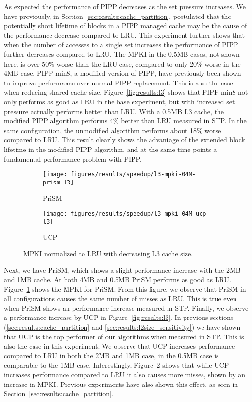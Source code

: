 As expected the performance of PIPP decreases as the set pressure increases.
We have previously, in Section~\ref{sec:results:cache_partition}, postulated that the potentially short lifetime of blocks in a PIPP managed cache may be the cause of the performance decrease compared to LRU.
This experiment further shows that when the number of accesses to a single set increases the performance of PIPP further decreases compared to LRU.
The MPKI in the 0.5MB cases, not shown here, is over 50\% worse than the LRU case, compared to only 20\% worse in the 4MB case.
PIPP-min8, a modified version of PIPP, have previously been shown to improve performance over normal PIPP replacement.
This is also the case when reducing shared cache size.
Figure~\ref{fig:results:l3} shows that PIPP-min8 not only performs as good as LRU in the base experiment, but with increased set pressure actually performs better than LRU.
With a 0.5MB L3 cache, the modified PIPP algorithm performs 4\% better than LRU measured in STP.
In the same configuration, the unmodified algorithm performs about 18\% worse compared to LRU.
This result clearly shows the advantage of the extended block lifetime in the modified PIPP algorithm, and at the same time points a fundamental performance problem with PIPP.


\begin{figure}[th]
    \centering
    \begin{subfigure}[b]{0.5\textwidth}
        \centering
        \texttt{[image: figures/results/speedup/l3-mpki-04M-prism-l3]}
        \caption{PriSM}
        \label{fig:results:l3:mpki-prism}
    \end{subfigure}%
    \begin{subfigure}[b]{0.5\textwidth}
        \centering
        \texttt{[image: figures/results/speedup/l3-mpki-04M-ucp-l3]}
        \caption{UCP}
        \label{fig:results:l3:mpki-ucp}
    \end{subfigure}
    \label{fig:results:l3:mpki}
    \caption{MPKI normalized to LRU with decreasing L3 cache size.}
\end{figure}

Next, we have PriSM, which shows a slight performance increase with the 2MB and 1MB cache. 
At both 4MB and 0.5MB PriSM performs as good as LRU.
Figure~\ref{fig:results:l3:mpki-prism} shows the MPKI for PriSM.
From this figure, we observe that PriSM in all configurations causes the same number of misses as LRU.
This is true even when PriSM shows an performance increase measured in STP.
Finally, we observe a performance increase by UCP in Figure~\ref{fig:results:l3}. 
In previous sections (\ref{sec:results:cache_partition} and \ref{sec:results:l2size_sensitivity}) we have shown that UCP is the top performer of our algorithms when measured in STP.
This is also the case in this experiment.
We observe that UCP increases performance compared to LRU in both the 2MB and 1MB case, in the 0.5MB case is comparable to the 1MB case.
Interestingly, Figure~\ref{fig:results:l3:mpki-ucp} shows that while UCP increases performance compared to LRU it also causes more misses, shown by an increase in MPKI.
Previous experiments have also shown this effect, as seen in Section~\ref{sec:results:cache_partition}.
